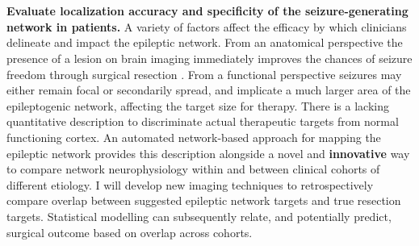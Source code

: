~\\
~\\
 \textbf{Evaluate localization accuracy and specificity of the seizure-generating network in patients.}
A variety of factors affect the efficacy by which clinicians delineate and impact the epileptic network. From an anatomical perspective the presence of a lesion on brain imaging immediately improves the chances of seizure freedom through surgical resection \cite{french2007refractory}. From a functional perspective seizures may either remain focal or secondarily spread, and implicate a much larger area of the epileptogenic network, affecting the target size for therapy. There is a lacking quantitative description to discriminate actual therapeutic targets from normal functioning cortex. An automated network-based approach for mapping the epileptic network provides this description alongside a novel and \textbf{innovative} way to compare network neurophysiology within and between clinical cohorts of different etiology. I will develop new imaging techniques to retrospectively compare overlap between suggested epileptic network targets and true resection targets. Statistical modelling can subsequently relate, and potentially predict, surgical outcome based on overlap across cohorts.


